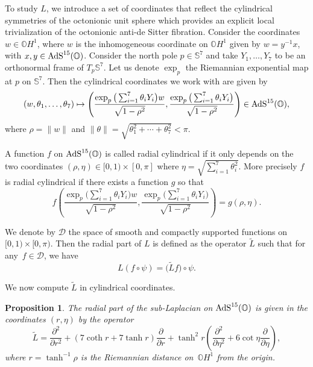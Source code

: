 \documentclass[10pt,a4paper]{amsart}
\numberwithin{equation}{section}
\newtheorem{Proposition}[Theorem]{Proposition}
 { \theoremstyle{definition}
\newtheorem{Example}[Theorem]{Example}
\newtheorem{Remark}[Theorem]{Remark} }
\begin{document}
To study $L$, we introduce a set of coordinates that reflect the cylindrical symmetries of the octonionic unit sphere which provides an explicit local trivialization of the octonionic anti-de Sitter fibration. Consider the coordinates $w\in \mathbb{O}H^1$, where $w$ is the inhomogeneous coordinate on $\mathbb{O}H^1$ given by $w=y^{-1} x$, with $x,y\in {\rm AdS}^{15}(\mathbb{O})$. Consider the north pole $p \in \mathbb{S}^7$ and take $Y_1, \dots , Y_7$ to be an orthonormal frame of $T_p \mathbb{S}^7$. Let us denote $\exp_p$ the Riemannian exponential map at $p$ on $\mathbb{S}^7$. Then the cylindrical coordinates we work with are given by
\begin{equation*}
(w,\theta_1, \dots , \theta_7) \mapsto \left(\frac{ \exp_p\big(\sum_{i=1}^{7}\theta_i Y_i\big) w}{\sqrt{1-{\rho}^2}},\frac{ \exp_p\big(\sum_{i=1}^{7}\theta_i Y_i\big)}{\sqrt{1-{\rho}^2}}\right)\in {\rm AdS}^{15}(\mathbb{O}),
\end{equation*}
where $\rho={\|w\|}$ and $\| \theta \|=\sqrt{\theta_1^2+\cdots + \theta_7^2} <\pi$.

A function $f$ on ${\rm AdS}^{15}(\mathbb{O})$ is called radial cylindrical if it only depends on the two coordinates $(\rho,\eta)\in [0,1)\times [0,\pi]$ where $\eta=\sqrt{\sum_{i=1}^{7}\theta^2_i}$. More precisely $f$ is radial cylindrical if there exists a function $g$ so that
\begin{equation*}
f \left(\frac{ \exp_p\big(\sum_{i=1}^{7}\theta_i Y_i\big) w}{\sqrt{1-{\rho}^2}},\frac{ \exp_p\big(\sum_{i=1}^{7}\theta_i Y_i\big)}{\sqrt{1-{\rho}^2}}\right)=g ( \rho, \eta ).
\end{equation*}

We denote by $\mathcal{D}$ the space of smooth and compactly supported functions on $[0,1) \times [0,\pi)$. Then the radial part of $L$ is defined as the operator $\widetilde{L}$ such that for any~$f\in \mathcal{D}$, we have
\begin{equation}\label{intertwining}
L(f \circ \psi)=\big(\widetilde{L}f\big)\circ \psi.
\end{equation}

We now compute $\widetilde{L}$ in cylindrical coordinates.

\begin{Proposition}\label{prop:1}
The radial part of the sub-Laplacian on ${\rm AdS}^{15}(\mathbb{O})$ is given in the coordinates $(r,\eta)$ by the operator
\begin{equation*}%
\widetilde{L}=\frac{{\partial}^2}{\partial {r}^2}+(7\coth r+7\tanh r)\frac{{\partial}}{\partial {r}}+{\tanh^2 r}\left(\frac{{\partial}^2}{\partial {\eta}^2}+6\cot \eta\frac{{\partial}}{\partial {\eta}}\right),
\end{equation*}
where $r=\tanh^{-1}\rho$ is the Riemannian distance on~$\mathbb{O}H^1$ from the origin.
\end{Proposition}
\end{document}
